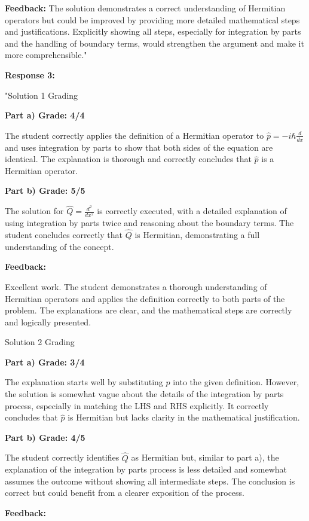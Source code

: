 \documentclass[a4paper,11pt]{article}
\begin{document}
\textbf{Feedback:} The solution demonstrates a correct understanding of Hermitian operators but could be improved by providing more detailed mathematical steps and justifications. Explicitly showing all steps, especially for integration by parts and the handling of boundary terms, would strengthen the argument and make it more comprehensible."

\textbf{Response 3:}

"Solution 1 Grading

\textbf{Part a) Grade: 4/4}

The student correctly applies the definition of a Hermitian operator to \( \hat{p} = -i\hbar\frac{d}{dx} \) and uses integration by parts to show that both sides of the equation are identical. The explanation is thorough and correctly concludes that \( \hat{p} \) is a Hermitian operator.

\textbf{Part b) Grade: 5/5}

The solution for \( \hat{Q} = \frac{d^{2}}{dx^{2}} \) is correctly executed, with a detailed explanation of using integration by parts twice and reasoning about the boundary terms. The student concludes correctly that \( \hat{Q} \) is Hermitian, demonstrating a full understanding of the concept.

\textbf{Feedback:}

Excellent work. The student demonstrates a thorough understanding of Hermitian operators and applies the definition correctly to both parts of the problem. The explanations are clear, and the mathematical steps are correctly and logically presented.

Solution 2 Grading

\textbf{Part a) Grade: 3/4}

The explanation starts well by substituting \( \hat{p} \) into the given definition. However, the solution is somewhat vague about the details of the integration by parts process, especially in matching the LHS and RHS explicitly. It correctly concludes that \( \hat{p} \) is Hermitian but lacks clarity in the mathematical justification.

\textbf{Part b) Grade: 4/5}

The student correctly identifies \( \hat{Q} \) as Hermitian but, similar to part a), the explanation of the integration by parts process is less detailed and somewhat assumes the outcome without showing all intermediate steps. The conclusion is correct but could benefit from a clearer exposition of the process.

\textbf{Feedback:}
\end{document}
